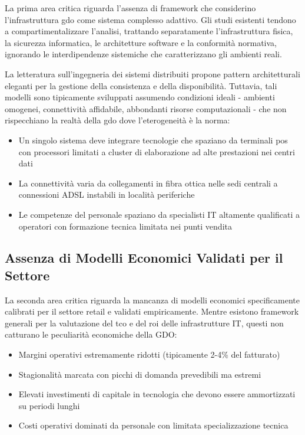 La prima area critica riguarda l'assenza di framework che considerino l'infrastruttura \gls{gdo} come sistema complesso adattivo. Gli studi esistenti tendono a compartimentalizzare l'analisi, trattando separatamente l'infrastruttura fisica, la sicurezza informatica, le architetture software e la conformità normativa, ignorando le interdipendenze sistemiche che caratterizzano gli ambienti reali.

La letteratura sull'ingegneria dei sistemi distribuiti propone pattern architetturali eleganti per la gestione della consistenza e della disponibilità. Tuttavia, tali modelli sono tipicamente sviluppati assumendo condizioni ideali - ambienti omogenei, connettività affidabile, abbondanti risorse computazionali - che non rispecchiano la realtà della \gls{gdo} dove l'eterogeneità è la norma:

\begin{itemize}
\item Un singolo sistema deve integrare tecnologie che spaziano da terminali \gls{pos} con processori limitati a cluster di elaborazione ad alte prestazioni nei centri dati
\item La connettività varia da collegamenti in fibra ottica nelle sedi centrali a connessioni ADSL instabili in località periferiche
\item Le competenze del personale spaziano da specialisti IT altamente qualificati a operatori con formazione tecnica limitata nei punti vendita
\end{itemize}

\subsection{\texorpdfstring{Assenza di Modelli Economici Validati per il Settore}{1.2.2 - Assenza di Modelli Economici Validati per il Settore}}
\label{subsec:assenza_modelli}

La seconda area critica riguarda la mancanza di modelli economici specificamente calibrati per il settore retail e validati empiricamente. Mentre esistono framework generali per la valutazione del \gls{tco} e del \gls{roi} delle infrastrutture IT, questi non catturano le peculiarità economiche della GDO:

\begin{itemize}
\item Margini operativi estremamente ridotti (tipicamente 2-4\% del fatturato)
\item Stagionalità marcata con picchi di domanda prevedibili ma estremi
\item Elevati investimenti di capitale in tecnologia che devono essere ammortizzati su periodi lunghi
\item Costi operativi dominati da personale con limitata specializzazione tecnica
\end{itemize}

